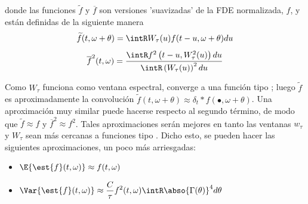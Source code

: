 donde las funciones $\widetilde{f}$ y $\overline{f}$ son versiones 'suavizadas' de la FDE 
normalizada, $f$, y están definidas de la siguiente manera
\begin{equation*}
\widetilde{f}(t,\omega+\theta) = 
\intR W_{\tau}(u) f(t-u,\omega+\theta) du
\end{equation*}
\begin{equation*}
\overline{f}^{2} (t,\omega) =
\frac{\intR f^{2}\left(t-u,W_{\tau}^{2}(u)\right) du}
{\intR \left( W_{\tau}(u) \right)^{2} du}
\end{equation*}

Como $W_{\tau}$ funciona como ventana espectral, converge a una 
función tipo \dirac; luego $\widetilde{f}$ es aproximadamente la convolución 
$\widetilde{f}(t,\omega+\theta) \approx \delta_t \ast f(\bullet,\omega+\theta)$. 
Una aproximación muy similar 
puede hacerse respecto al segundo término, de modo que $\widetilde{f}\approx f$ y 
$\overline{f}^{2}\approx f^{2}$.
Tales aproximaciones serán mejores en tanto las ventanas $w_{\tau}$ y $W_{\tau}$ sean más 
cercanas a funciones tipo \dirac.
Dicho esto, se pueden hacer las siguientes aproximaciones, un poco más arriesgadas:
\begin{itemize}
\item $\displaystyle \E{\est{f}(t,\omega)} \approx f(t,\omega)$
\item $\displaystyle \Var{\est{f}(t,\omega)} \approx 
\frac{C}{\tau} f^{2}(t,\omega) \intR \abso{\Gamma (\theta)}^{4} d\theta$
\end{itemize}



